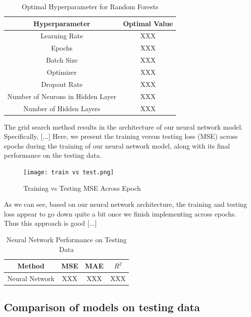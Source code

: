 \documentclass[conference]{IEEEtran}
\begin{document}
\begin{table}[H]
\centering
\caption{Optimal Hyperparameter for Random Forests}
\begin{tabular}{|c|c|}
\hline
Hyperparameter & Optimal Value \\
\hline
Learning Rate & XXX \\
\hline
Epochs & XXX \\
\hline
Batch Size & XXX \\
\hline
Optimizer & XXX \\
\hline
Dropout Rate & XXX \\
\hline
Number of Neurons in Hidden Layer & XXX \\
\hline
Number of Hidden Layers & XXX \\
\hline
\end{tabular}
\label{tab:mytable}
\end{table}

The grid search method results in the architecture of our neural network model. Specifically, [...] Here, we present the training versus testing loss (MSE) across epochs during the training of our neural network model, along with its final performance on the testing data.

\begin{figure}[H]
    \centering
    \texttt{[image: train vs test.png]} %
    \caption{Training vs Testing MSE Across Epoch}
    \label{fig:boxplots}
\end{figure}

As we can see, based on our neural network architecture, the training and testing loss appear to go down quite a bit once we finish implementing across epochs. Thus this approach is good [...]

\begin{table}[H]
\centering
\caption{Neural Network Performance on Testing Data}
\begin{tabular}{|c|c|c|c|}
\hline
Method & MSE & MAE & $R^2$ \\
\hline
Neural Network & XXX & XXX & XXX \\
\hline
\end{tabular}
\label{tab:mytable}
\end{table}

\subsection{Comparison of models on testing data}
\end{document}
